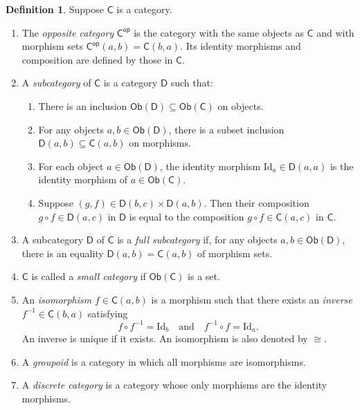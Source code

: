 \documentclass{amsbook}
\numberwithin{section}{chapter}
\numberwithin{subsection}{section}
\numberwithin{equation}{section}
\theoremstyle{plain}
\theoremstyle{definition}
\newtheorem{definition}[equation]{Definition}
\newcommand{\op}{\mathsf{op}}
\newcommand{\C}{\mathsf{C}}
\newcommand{\Cop}{\C^{\op}}
\newcommand{\D}{\mathsf{D}}
\newcommand{\Id}{\mathrm{Id}}
\newcommand{\Ob}{\mathsf{Ob}}
\newcommand{\Obc}{\Ob(\C)}
\newcommand{\Obd}{\Ob(\D)}
\newcommand{\comp}{\circ}
\newcommand{\andspace}{\quad\text{and}\quad}
\begin{document}
\begin{definition}\label{def:subcat}
Suppose $\C$ is a category.  
\begin{enumerate}
\item The \emph{opposite category} $\Cop$ is the category with the same objects as $\C$ and with morphism sets $\Cop(a,b) = \C(b,a)$.\label{notation:opposite-category}  Its identity morphisms and composition are defined by those in $\C$.
\item A \emph{subcategory} of $\C$ is a category $\D$ such that:
\begin{enumerate}
\item There is an inclusion $\Obd \subseteq \Obc$ on objects.
\item For any objects $a,b \in \Obd$, there is a subset inclusion $\D(a,b) \subseteq \C(a,b)$ on morphisms.
\item For each object $a \in \Obd$, the identity morphism $\Id_a \in \D(a,a)$ is the identity morphism of $a \in \Obc$.
\item Suppose $(g,f) \in \D(b,c) \times \D(a,b)$.  Then their composition $g \comp f \in \D(a,c)$ in $\D$ is equal to the composition $g \comp f \in \C(a,c)$ in $\C$.
\end{enumerate}
\item A subcategory $\D$ of $\C$ is a \emph{full subcategory} if, for any objects $a,b \in \Obd$, there is an equality $\D(a,b) = \C(a,b)$ of morphism sets.
\item $\C$ is called a \emph{small category} if $\Obc$ is a set.
\item An \emph{isomorphism} $f \in \C(a,b)$ is a morphism such that there exists an \emph{inverse} $f^{-1} \in \C(b,a)$ satisfying
\[f \comp f^{-1} = \Id_b \andspace f^{-1} \comp f = \Id_a.\]
An inverse is unique if it exists.  An isomorphism is also denoted by $\cong$.\label{notation:iso}
\item A \emph{groupoid} is a category in which all morphisms are isomorphisms.  
\item A \emph{discrete category} is a category whose only morphisms are the identity morphisms.
\end{enumerate}
\end{definition}
\end{document}
